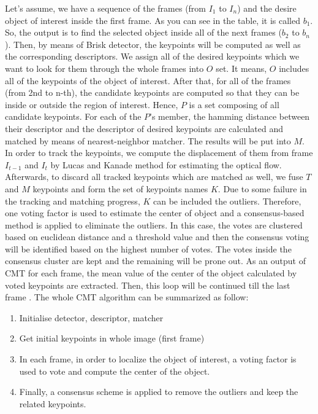 \documentclass[[12pt,DIV14,BCOR12mm,a4paper,footexclude,headinclude,halfparskip-,twoside,openright,cleardoubleempty,idxtotoc,bibtotoc]{article}
\begin{document}
Let's assume, we have a sequence of the frames (from $I_1$ to $I_n$) and the desire object of interest inside the first frame. As you can see in the table, it is called $b_1$. 
So, the output is to find the selected object inside all of the next frames ($b_2$ to $b_n$). Then, by means of Brisk detector, the keypoints will be computed as well as the corresponding descriptors. We assign all of the desired keypoints which we want to look for them through the whole frames into $O$ set. It means, $O$ includes all of the keypoints of the object of interest. After that, for all of the frames (from 2nd to n-th), the candidate keypoints are computed so that they can be inside or outside the region of interest. Hence, $P$ is a set composing of all candidate keypoints. For each of the $P$'s member, the hamming distance between their descriptor and the descriptor of desired keypoints are calculated and matched by means of nearest-neighbor matcher. The results will be put into $M$. In order to track the keypoints, we compute the displacement of them from frame $I_{t-1}$ and $I_{t}$ by Lucas and Kanade method for estimating the optical flow. Afterwards, to discard all tracked keypoints which are matched as well, we fuse $T$ and $M$ keypoints and form the set of keypoints names $K$. Due to some failure in the tracking and matching progress, $K$ can be included the outliers. Therefore, one voting factor is used to estimate the center of object and a consensus-based method is applied to eliminate the outliers. In this case, the votes are clustered based on euclidean distance and a threshold value and then the consensus voting will be identified based on the highest number of votes. The votes inside the consensus cluster are kept and the remaining will be prone out. As an output of CMT for each frame, the mean value of the center of the object calculated by voted keypoints are extracted. Then, this loop will be continued till the last frame \cite{nebehay2014consensus}. The whole CMT algorithm can be summarized as follow:


\begin{enumerate}

\item Initialise detector, descriptor, matcher
\item Get initial keypoints in whole image (first frame)
\item In each frame, in order to localize the object of interest, a voting factor is used to vote and compute the center of the object.
\item Finally, a consensus scheme is applied to remove the outliers and keep the related keypoints.
\end{enumerate}
\end{document}
